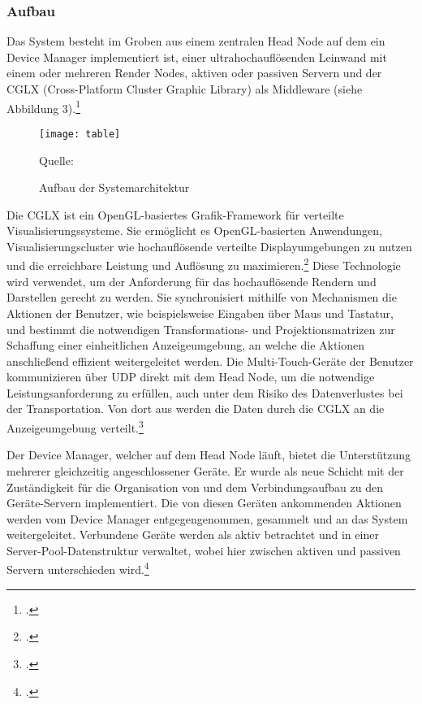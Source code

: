 \subsubsection{Aufbau}
Das System besteht im Groben aus einem zentralen Head Node auf dem ein Device Manager implementiert ist, einer ultrahochauflösenden Leinwand mit einem oder mehreren Render Nodes, aktiven oder passiven Servern und der CGLX (Cross-Platform Cluster Graphic Library) als Middleware (siehe Abbildung 3).\footcite[Vgl.][Seite 651 f.]{Table}

\begin{figure}[H]
\begin{center}
\texttt{[image: table]}
\caption{Aufbau der Systemarchitektur}
Quelle: \cite[Seite 651]{Table}
\end{center}
\end{figure}
\vspace{-1cm}

Die CGLX ist ein OpenGL-basiertes Grafik-Framework für verteilte Visualisierungssysteme. Sie ermöglicht es OpenGL-basierten Anwendungen, Visualisierungscluster wie hochauflösende verteilte Displayumgebungen zu nutzen und die erreichbare Leistung und Auflösung zu maximieren.\footcite[Vgl.][Seite 320]{CGLX} Diese Technologie wird verwendet, um der Anforderung für das hochauflösende Rendern und Darstellen gerecht zu werden. Sie synchronisiert mithilfe von Mechanismen die Aktionen der Benutzer, wie beispielsweise Eingaben über Maus und Tastatur, und bestimmt die notwendigen Transformations- und Projektionsmatrizen zur Schaffung einer einheitlichen Anzeigeumgebung, an welche die Aktionen anschließend effizient weitergeleitet werden. Die Multi-Touch-Geräte der Benutzer kommunizieren über UDP direkt mit dem Head Node, um die notwendige Leistungsanforderung zu erfüllen, auch unter dem Risiko des Datenverlustes bei der Transportation. Von dort aus werden die Daten durch die CGLX an die Anzeigeumgebung verteilt.\footcite[Vgl.][Seite 651]{Table}

Der Device Manager, welcher auf dem Head Node läuft, bietet die Unterstützung mehrerer gleichzeitig angeschlossener Geräte. Er wurde als neue Schicht mit der Zuständigkeit für die Organisation von und dem Verbindungsaufbau zu den Geräte-Servern implementiert. Die von diesen Geräten ankommenden Aktionen werden vom Device Manager entgegengenommen, gesammelt und an das System weitergeleitet. Verbundene Geräte werden als aktiv betrachtet und in einer Server-Pool-Datenstruktur verwaltet, wobei hier zwischen aktiven und passiven Servern unterschieden wird.\footcite[Vgl.][]{Table}

